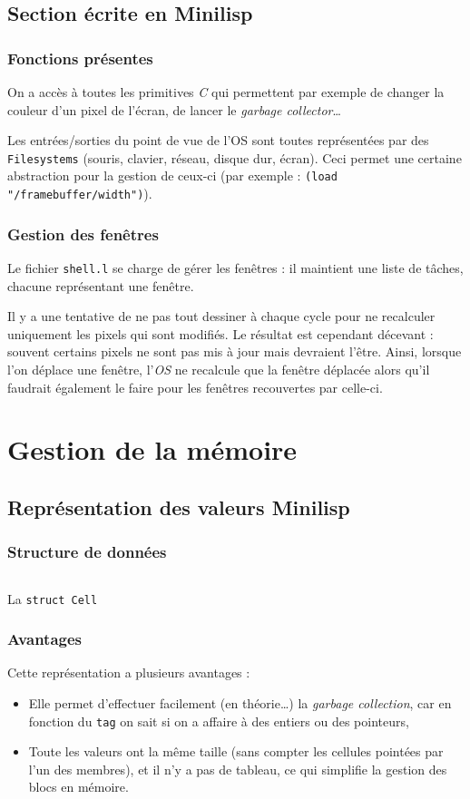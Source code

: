\documentclass[c, 11pt, handout, xcolor=table]{beamer}
\newcommand{\source}[5]{
  \begin{table}[H]
    \centering
    \inputminted[frame=lines,linenos,style=colorful,fontfamily=tt,breaklines,autogobble,firstline=#3,firstnumber=#3,lastline=#4,label={#2[#3--#4]}]{#1}{../interim/sledge/#2}
    \captionsetup{name=Listing,labelformat=listing,labelsep=endash}
    \caption{#5}
  \end{table}
  }
\newcommand{\sourceC}[4]{\source{C}{#1}{#2}{#3}{#4}}
\newcommand{\codeC}[1]{\texttt{#1}}
\newcommand{\codeLisp}[1]{\texttt{#1}}
\newcommand{\code}[1]{\texttt{#1}}
\newcommand{\foreign}[1]{\emph{#1}}
\begin{document}
\subsection{Section écrite en Minilisp}

\begin{frame}
 \frametitle{Fonctions présentes}
 
 On a accès à toutes les primitives \foreign{C} qui permettent par exemple de changer la couleur d'un pixel de l'écran, de lancer le \foreign{garbage collector}\ldots
 
 Les entrées/sorties du point de vue de l'OS sont toutes représentées par des \codeC{Filesystems} (souris, clavier, réseau, disque dur, écran). Ceci permet une certaine abstraction pour la gestion de ceux-ci (par exemple : \codeLisp{(load "/framebuffer/width")}).
\end{frame}

\begin{frame}
 \frametitle{Gestion des fenêtres}
 
 Le fichier \code{shell.l} se charge de gérer les fenêtres : il maintient une liste de tâches, chacune représentant une fenêtre.
 
 Il y a une tentative de ne pas tout dessiner à chaque cycle pour ne recalculer uniquement les pixels qui sont modifiés. Le résultat est cependant décevant : souvent certains pixels ne sont pas mis à jour mais devraient l'être. Ainsi, lorsque l'on déplace une fenêtre, l'\foreign{OS} ne recalcule que la fenêtre déplacée alors qu'il faudrait également le faire pour les fenêtres recouvertes par celle-ci.
\end{frame}



\section{Gestion de la mémoire}

\subsection{Représentation des valeurs Minilisp}

\begin{frame}
 \frametitle{Structure de données}
 \sourceC{minilisp.h}{81}{91}{La \codeC{struct Cell}}
\end{frame}

\begin{frame}
 \frametitle{Avantages}
 Cette représentation a plusieurs avantages :
 \begin{itemize}
  \item Elle permet d'effectuer facilement (en théorie\ldots) la \foreign{garbage collection}, car en fonction du \codeC{tag} on sait si on a affaire à des entiers ou des pointeurs,
  \item Toute les valeurs ont la même taille (sans compter les cellules pointées par l'un des membres), et il n'y a pas de tableau, ce qui simplifie la gestion des blocs en mémoire.
 \end{itemize}
\end{frame}
\end{document}
